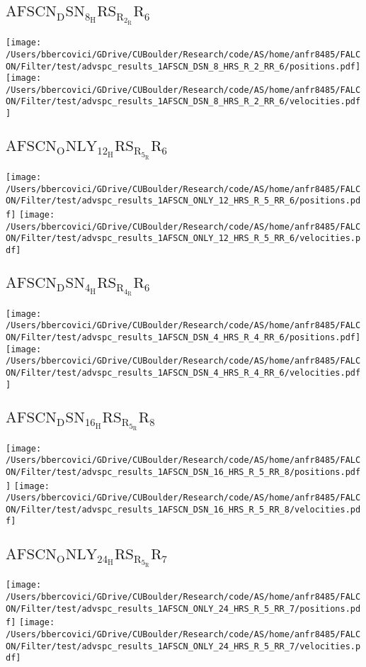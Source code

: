 \subsection{$\mathrm{AFSCN_DSN_8_HRS_R_2_RR_6}$}
\texttt{[image: /Users/bbercovici/GDrive/CUBoulder/Research/code/AS/home/anfr8485/FALCON/Filter/test/advspc\_results\_1AFSCN\_DSN\_8\_HRS\_R\_2\_RR\_6/positions.pdf]}
\texttt{[image: /Users/bbercovici/GDrive/CUBoulder/Research/code/AS/home/anfr8485/FALCON/Filter/test/advspc\_results\_1AFSCN\_DSN\_8\_HRS\_R\_2\_RR\_6/velocities.pdf]}
\subsection{$\mathrm{AFSCN_ONLY_12_HRS_R_5_RR_6}$}
\texttt{[image: /Users/bbercovici/GDrive/CUBoulder/Research/code/AS/home/anfr8485/FALCON/Filter/test/advspc\_results\_1AFSCN\_ONLY\_12\_HRS\_R\_5\_RR\_6/positions.pdf]}
\texttt{[image: /Users/bbercovici/GDrive/CUBoulder/Research/code/AS/home/anfr8485/FALCON/Filter/test/advspc\_results\_1AFSCN\_ONLY\_12\_HRS\_R\_5\_RR\_6/velocities.pdf]}
\subsection{$\mathrm{AFSCN_DSN_4_HRS_R_4_RR_6}$}
\texttt{[image: /Users/bbercovici/GDrive/CUBoulder/Research/code/AS/home/anfr8485/FALCON/Filter/test/advspc\_results\_1AFSCN\_DSN\_4\_HRS\_R\_4\_RR\_6/positions.pdf]}
\texttt{[image: /Users/bbercovici/GDrive/CUBoulder/Research/code/AS/home/anfr8485/FALCON/Filter/test/advspc\_results\_1AFSCN\_DSN\_4\_HRS\_R\_4\_RR\_6/velocities.pdf]}
\subsection{$\mathrm{AFSCN_DSN_16_HRS_R_5_RR_8}$}
\texttt{[image: /Users/bbercovici/GDrive/CUBoulder/Research/code/AS/home/anfr8485/FALCON/Filter/test/advspc\_results\_1AFSCN\_DSN\_16\_HRS\_R\_5\_RR\_8/positions.pdf]}
\texttt{[image: /Users/bbercovici/GDrive/CUBoulder/Research/code/AS/home/anfr8485/FALCON/Filter/test/advspc\_results\_1AFSCN\_DSN\_16\_HRS\_R\_5\_RR\_8/velocities.pdf]}
\subsection{$\mathrm{AFSCN_ONLY_24_HRS_R_5_RR_7}$}
\texttt{[image: /Users/bbercovici/GDrive/CUBoulder/Research/code/AS/home/anfr8485/FALCON/Filter/test/advspc\_results\_1AFSCN\_ONLY\_24\_HRS\_R\_5\_RR\_7/positions.pdf]}
\texttt{[image: /Users/bbercovici/GDrive/CUBoulder/Research/code/AS/home/anfr8485/FALCON/Filter/test/advspc\_results\_1AFSCN\_ONLY\_24\_HRS\_R\_5\_RR\_7/velocities.pdf]}
